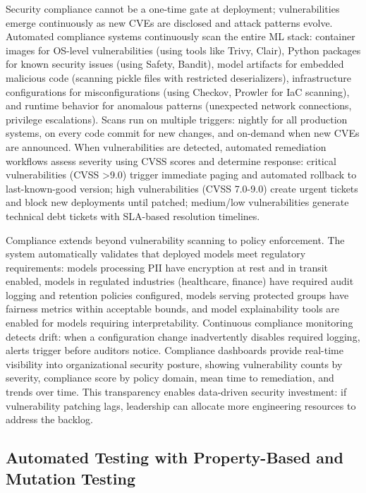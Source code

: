 Security compliance cannot be a one-time gate at deployment; vulnerabilities emerge continuously as new CVEs are disclosed and attack patterns evolve. Automated compliance systems continuously scan the entire ML stack: container images for OS-level vulnerabilities (using tools like Trivy, Clair), Python packages for known security issues (using Safety, Bandit), model artifacts for embedded malicious code (scanning pickle files with restricted deserializers), infrastructure configurations for misconfigurations (using Checkov, Prowler for IaC scanning), and runtime behavior for anomalous patterns (unexpected network connections, privilege escalations). Scans run on multiple triggers: nightly for all production systems, on every code commit for new changes, and on-demand when new CVEs are announced. When vulnerabilities are detected, automated remediation workflows assess severity using CVSS scores and determine response: critical vulnerabilities (CVSS >9.0) trigger immediate paging and automated rollback to last-known-good version; high vulnerabilities (CVSS 7.0-9.0) create urgent tickets and block new deployments until patched; medium/low vulnerabilities generate technical debt tickets with SLA-based resolution timelines.

Compliance extends beyond vulnerability scanning to policy enforcement. The system automatically validates that deployed models meet regulatory requirements: models processing PII have encryption at rest and in transit enabled, models in regulated industries (healthcare, finance) have required audit logging and retention policies configured, models serving protected groups have fairness metrics within acceptable bounds, and model explainability tools are enabled for models requiring interpretability. Continuous compliance monitoring detects drift: when a configuration change inadvertently disables required logging, alerts trigger before auditors notice. Compliance dashboards provide real-time visibility into organizational security posture, showing vulnerability counts by severity, compliance score by policy domain, mean time to remediation, and trends over time. This transparency enables data-driven security investment: if vulnerability patching lags, leadership can allocate more engineering resources to address the backlog.

\subsection{Automated Testing with Property-Based and Mutation Testing}

